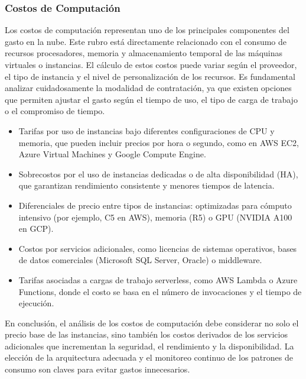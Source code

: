 {            \subsubsection{Costos de Computación}
                Los costos de computación representan uno de los principales componentes del gasto en la nube. Este rubro está directamente relacionado con el consumo de recursos procesadores, memoria y almacenamiento temporal de las máquinas virtuales o instancias. El cálculo de estos costos puede variar según el proveedor, el tipo de instancia y el nivel de personalización de los recursos. Es fundamental analizar cuidadosamente la modalidad de contratación, ya que existen opciones que permiten ajustar el gasto según el tiempo de uso, el tipo de carga de trabajo o el compromiso de tiempo.
                
                \begin{itemize}
                    \item Tarifas por uso de instancias bajo diferentes configuraciones de CPU y memoria, que pueden incluir precios por hora o segundo, como en AWS EC2, Azure Virtual Machines y Google Compute Engine.
                    \item Sobrecostos por el uso de instancias dedicadas o de alta disponibilidad (HA), que garantizan rendimiento consistente y menores tiempos de latencia.
                    \item Diferenciales de precio entre tipos de instancias: optimizadas para cómputo intensivo (por ejemplo, C5 en AWS), memoria (R5) o GPU (NVIDIA A100 en GCP).
                    \item Costos por servicios adicionales, como licencias de sistemas operativos, bases de datos comerciales (Microsoft SQL Server, Oracle) o middleware.
                    \item Tarifas asociadas a cargas de trabajo serverless, como AWS Lambda o Azure Functions, donde el costo se basa en el número de invocaciones y el tiempo de ejecución.
                \end{itemize}

                En conclusión, el análisis de los costos de computación debe considerar no solo el precio base de las instancias, sino también los costos derivados de los servicios adicionales que incrementan la seguridad, el rendimiento y la disponibilidad. La elección de la arquitectura adecuada y el monitoreo continuo de los patrones de consumo son claves para evitar gastos innecesarios.
                
}
